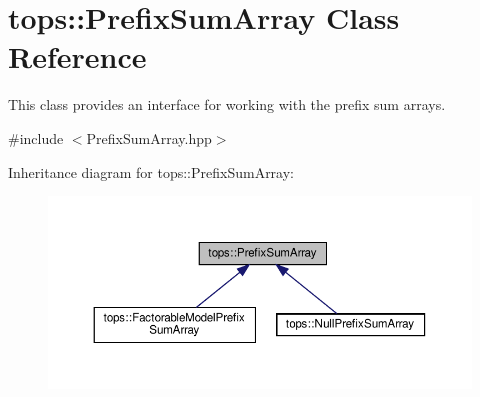 \hypertarget{classtops_1_1PrefixSumArray}{}\section{tops\+:\+:Prefix\+Sum\+Array Class Reference}
\label{classtops_1_1PrefixSumArray}


This class provides an interface for working with the prefix sum arrays.  




{\ttfamily \#include $<$Prefix\+Sum\+Array.\+hpp$>$}



Inheritance diagram for tops\+:\+:Prefix\+Sum\+Array\+:
\nopagebreak
\begin{figure}[H]
\begin{center}
\leavevmode
\includegraphics[width=350pt]{classtops_1_1PrefixSumArray__inherit__graph}
\end{center}
\end{figure}
